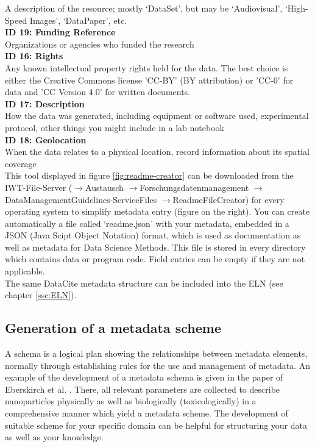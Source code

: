 A description of the resource; mostly ‘DataSet’, but may be ‘Audiovisual’,
‘High-Speed Images’, ‘DataPaper’, etc. \\[6pt]
%
\textbf{ID 19: Funding Reference} \\
Organizations or agencies who funded the research \\[6pt]
%
\textbf{ID 16: Rights} \\
Any known intellectual property rights held for the data. The best choice is
either the Creative Commons license 'CC-BY' (BY attribution) or 'CC-0' for
data and 'CC Version 4.0' for written documents. \\[6pt]
%
\textbf{ID 17: Description} \\
How the data was generated, including equipment or software used, experimental
protocol, other things you might include in a lab notebook \\[6pt]
%
\textbf{ID 18: Geolocation} \\
When the data relates to a physical location, record information about its
spatial coverage \\[6pt]
%
This tool displayed in figure \ref{fig:readme-creator} can be downloaded from the IWT-File-Server ($\rightarrow$Austausch $\rightarrow$Forschungs\-datenmanagement $\rightarrow$DataManagementGuidelines-ServiceFiles $\rightarrow$ReadmeFileCreator) for every operating system to simplify metadata entry (figure on the right). You can create automatically a file called ‘readme.json’ with your metadata, embedded in a JSON (Java Scipt Object Notation) format, which is used as documentation as well as metadata for Data Science Methods. This file is stored in every directory which contains data or program code. Field entries can be empty if they are not applicable. \\
%
The same DataCite metadata structure can be included into the ELN (see chapter \ref{ssc:ELN}).



\subsection{Generation of a metadata scheme}
A schema is a logical plan showing the relationships between metadata elements,
normally through establishing rules for the use and management of metadata. An example of the development of a metadata schema is given in the paper of Eberskirch et al. \cite{elberskirch:2022}. There, all relevant parameters are collected to describe nanoparticles physically as well as biologically (toxicologically) in a comprehensive manner which yield a metadata scheme.
The development of suitable scheme for your specific domain can be helpful for structuring your data as well as your knowledge.




